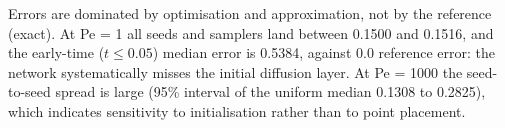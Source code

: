 Errors are dominated by optimisation and approximation, not by the reference (exact). At Pe = 1 all seeds and
samplers land between 0.1500 and 0.1516, and the early-time ($t\le0.05$) median error is 0.5384, against 0.0
reference error: the network systematically misses the initial diffusion layer. At Pe = 1000 the
seed-to-seed spread is large (95\% interval of the uniform median 0.1308 to 0.2825), which indicates
sensitivity to initialisation rather than to point placement.
